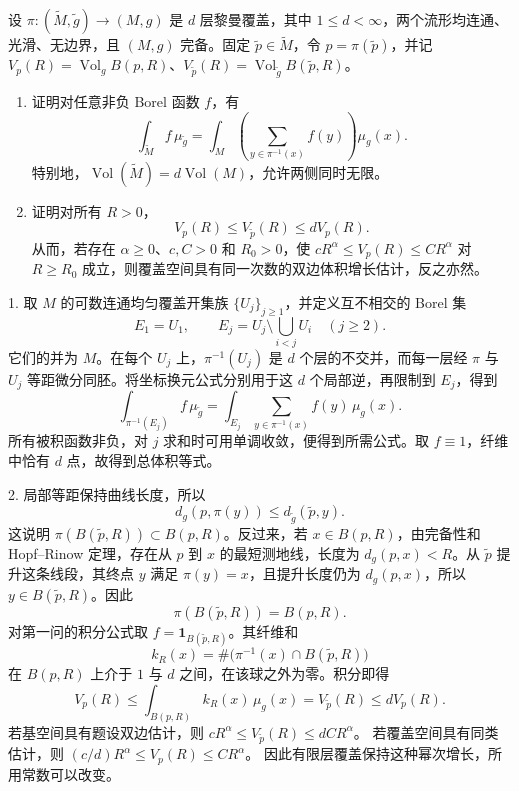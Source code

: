 \begin{exercise}\label{g3:ex:finite-cover-volume-growth}
	设 \(\pi:(\widetilde M,\widetilde g)\to(M,g)\) 是 \(d\) 层黎曼覆盖，其中 \(1\le d<\infty\)，两个流形均连通、光滑、无边界，且 \((M,g)\) 完备。固定 \(\widetilde p\in\widetilde M\)，令 \(p=\pi(\widetilde p)\)，并记 \(V_p(R)=\operatorname{Vol}_gB(p,R)\)、\(V_{\widetilde p}(R)=\operatorname{Vol}_{\widetilde g}B(\widetilde p,R)\)。
	\begin{enumerate}
		\item 证明对任意非负 Borel 函数 \(f\)，有
		\[
			\int_{\widetilde M}f\,\mu_{\widetilde g}
			=\int_M\left(\sum_{y\in\pi^{-1}(x)}f(y)\right)\mu_g(x).
		\]
		特别地，\(\operatorname{Vol}(\widetilde M)=d\operatorname{Vol}(M)\)，允许两侧同时无限。
		\item 证明对所有 \(R>0\)，
		\[
			V_p(R)\le V_{\widetilde p}(R)\le dV_p(R).
		\]
		从而，若存在 \(\alpha\ge0\)、\(c,C>0\) 和 \(R_0>0\)，使
		\(cR^\alpha\le V_p(R)\le CR^\alpha\) 对 \(R\ge R_0\) 成立，则覆盖空间具有同一次数的双边体积增长估计，反之亦然。
	\end{enumerate}
\end{exercise}
\begin{solution}
	1. 取 \(M\) 的可数连通均匀覆盖开集族 \(\{U_j\}_{j\ge1}\)，并定义互不相交的 Borel 集
	\[
		E_1=U_1,\qquad
		E_j=U_j\setminus\bigcup_{i<j}U_i\quad(j\ge2).
	\]
	它们的并为 \(M\)。在每个 \(U_j\) 上，\(\pi^{-1}(U_j)\) 是 \(d\) 个层的不交并，而每一层经 \(\pi\) 与 \(U_j\) 等距微分同胚。将坐标换元公式分别用于这 \(d\) 个局部逆，再限制到 \(E_j\)，得到
	\[
		\int_{\pi^{-1}(E_j)}f\,\mu_{\widetilde g}
		=\int_{E_j}\sum_{y\in\pi^{-1}(x)}f(y)\,\mu_g(x).
	\]
	所有被积函数非负，对 \(j\) 求和时可用单调收敛，便得到所需公式。取 \(f\equiv1\)，纤维中恰有 \(d\) 点，故得到总体积等式。

	2. 局部等距保持曲线长度，所以
	\[
		d_g(p,\pi(y))\le d_{\widetilde g}(\widetilde p,y).
	\]
	这说明 \(\pi(B(\widetilde p,R))\subset B(p,R)\)。反过来，若 \(x\in B(p,R)\)，由完备性和 Hopf--Rinow 定理，存在从 \(p\) 到 \(x\) 的最短测地线，长度为 \(d_g(p,x)<R\)。从 \(\widetilde p\) 提升这条线段，其终点 \(y\) 满足 \(\pi(y)=x\)，且提升长度仍为 \(d_g(p,x)\)，所以 \(y\in B(\widetilde p,R)\)。因此
	\[
		\pi(B(\widetilde p,R))=B(p,R).
	\]
	对第一问的积分公式取 \(f=\mathbf1_{B(\widetilde p,R)}\)。其纤维和
	\[
		k_R(x)=\#\bigl(\pi^{-1}(x)\cap B(\widetilde p,R)\bigr)
	\]
	在 \(B(p,R)\) 上介于 \(1\) 与 \(d\) 之间，在该球之外为零。积分即得
	\[
		V_p(R)\le\int_{B(p,R)}k_R(x)\,\mu_g(x)
		=V_{\widetilde p}(R)\le dV_p(R).
	\]
	若基空间具有题设双边估计，则
	\(cR^\alpha\le V_{\widetilde p}(R)\le dCR^\alpha\)。
	若覆盖空间具有同类估计，则
	\((c/d)R^\alpha\le V_p(R)\le CR^\alpha\)。
	因此有限层覆盖保持这种幂次增长，所用常数可以改变。
\end{solution}

